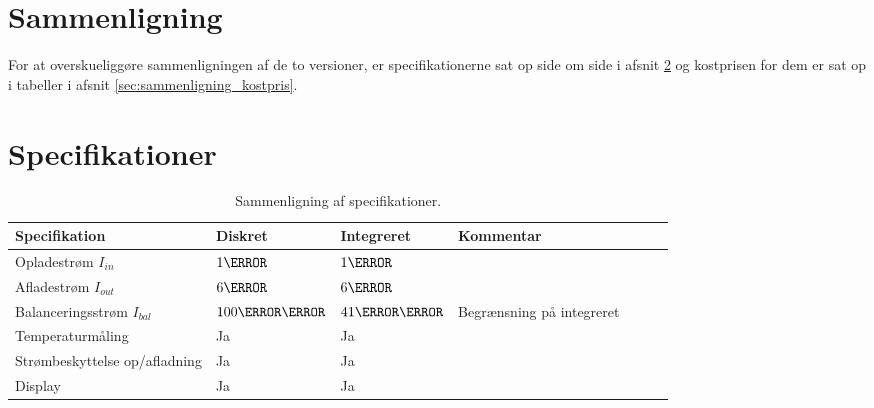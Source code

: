 \section{Sammenligning} \label{afs:sammenligning}
For at overskueliggøre sammenligningen af de to versioner, er specifikationerne sat op side om side i afsnit \ref{sec:sammenligning_specifikation} og kostprisen for dem er sat op i tabeller i afsnit \ref{sec:sammenligning_kostpris}.

\section{Specifikationer} \label{sec:sammenligning_specifikation}

\begin{table}[h!]
	\small
	\centering
	\begin{threeparttable}
		\begin{tabular}{ l l l l l l l }
			\toprule
			\multicolumn{1}{l}{\textbf{Specifikation}}          &
			\multicolumn{1}{l}{\textbf{Diskret}}           &
			\multicolumn{1}{l}{\textbf{Integreret}}  &
			\multicolumn{1}{l}{\textbf{Kommentar}}   \\ 
			\hline
			Opladestrøm $I_{in}$           &  $1\ampere$            & $1\ampere$            &    \\
			Afladestrøm $I_{out}$          &   $6\ampere$           & $6\ampere$            &    \\
			Balanceringsstrøm $I_{bal}$    & $100\milli\ampere$     & $41\milli\ampere$     &  Begrænsning på integreret  \\
			Temperaturmåling               &   Ja                   &  Ja                   &    \\
			Strømbeskyttelse op/afladning  &   Ja                   &  Ja                   &    \\
			Display                        &   Ja                   &  Ja                   &    \\

			\bottomrule
		\end{tabular}
		\caption{Sammenligning af specifikationer.}
		\label{tab:specifikationer}
	\end{threeparttable}
\end{table} 
\FloatBlock





